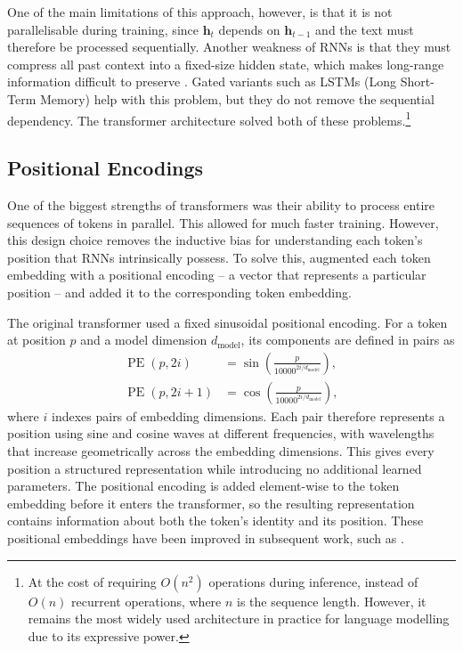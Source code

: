 One of the main limitations of this approach, however, is that it is not parallelisable during training, since $\mathbf{h}_t$ depends on $\mathbf{h}_{t-1}$ and the text must therefore be processed sequentially. Another weakness of RNNs is that they must compress all past context into a fixed-size hidden state, which makes long-range information difficult to preserve \citep{Bahdanau2014NeuralMT}. Gated variants such as LSTMs (Long Short-Term Memory) help with this problem, but they do not remove the sequential dependency. The transformer architecture solved both of these problems.\footnote{At the cost of requiring $O(n^2)$ operations during inference, instead of $O(n)$ recurrent operations, where $n$ is the sequence length. However, it remains the most widely used architecture in practice for language modelling due to its expressive power.}

\subsection{Positional Encodings}
One of the biggest strengths of transformers \citep{vaswani2017attention} was their ability to process entire sequences of tokens in parallel. This allowed for much faster training. However, this design choice removes the inductive bias for understanding each token's position that RNNs intrinsically possess. To solve this, \cite{vaswani2017attention} augmented each token embedding with a positional encoding -- a vector that represents a particular position -- and added it to the corresponding token embedding.

The original transformer used a fixed sinusoidal positional encoding. For a token at position $p$ and a model dimension $d_{\mathrm{model}}$, its components are defined in pairs as
\begin{align}
    \operatorname{PE}(p,2i)
    &= \sin\!\left(\frac{p}{10000^{2i/d_{\mathrm{model}}}}\right), \\
    \operatorname{PE}(p,2i+1)
    &= \cos\!\left(\frac{p}{10000^{2i/d_{\mathrm{model}}}}\right),
    \label{eq:sinusoidal_positional_encoding}
\end{align}
where $i$ indexes pairs of embedding dimensions. Each pair therefore represents a position using sine and cosine waves at different frequencies, with wavelengths that increase geometrically across the embedding dimensions. This gives every position a structured representation while introducing no additional learned parameters. The positional encoding is added element-wise to the token embedding before it enters the transformer, so the resulting representation contains information about both the token's identity and its position. These positional embeddings have been improved in subsequent work, such as \citet{su2023roformerenhancedtransformerrotary}.

